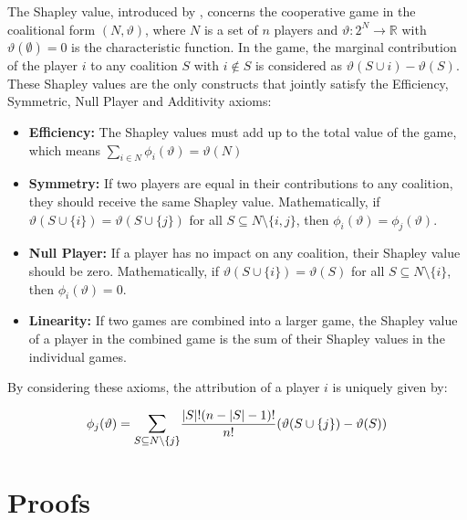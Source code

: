 \documentclass{article} %
\theoremstyle{bfnote}
\begin{document}
The Shapley value, introduced by \cite{shapley1952}, concerns the cooperative game in the coalitional form $(N, \vartheta)$, where $N$ is a set of $n$ players and $\vartheta: 2^N \rightarrow \mathbb{R}$ with $\vartheta(\emptyset)=0$ is the characteristic function. In the game, the marginal contribution of the player $i$ to any coalition $S$ with $i \notin S$ is considered as $\vartheta(S \cup i)-\vartheta(S)$. These Shapley values are the only constructs that jointly satisfy the Efficiency, Symmetric, Null Player and Additivity axioms:

\begin{itemize}
	
	\item \textbf{Efficiency:} The Shapley values must add up to the total value of the game, which means $\sum_{i \in N} \phi_i(\vartheta) = \vartheta(N)$
	\item \textbf{Symmetry:} If two players are equal in their contributions to any coalition, they should receive the same Shapley value. Mathematically, if \(\vartheta(S \cup \{i\}) = \vartheta(S \cup \{j\})\) for all \(S \subseteq N \setminus \{i, j\}\), then \(\phi_i(\vartheta) = \phi_j(\vartheta)\).
	\item \textbf{Null Player:} If a player has no impact on any coalition, their Shapley value should be zero. Mathematically, if \(\vartheta(S \cup \{i\}) = \vartheta(S)\) for all \(S \subseteq N \setminus \{i\}\), then \(\phi_i(\vartheta) = 0\).
	\item \textbf{Linearity:} If two games are combined into a larger game, the Shapley value of a player in the combined game is the sum of their Shapley values in the individual games.
	
\end{itemize}

 By considering these axioms, the attribution of a player $i$ is uniquely given by:

\begin{equation*}
	\phi_j(\vartheta)=\mathlarger{\sum\limits_{S \subseteq N \backslash\{j\}}} \frac{|S| !(n-|S|-1) !}{n !}(\vartheta(S \cup\{j\})-\vartheta(S))
\end{equation*}

\section{Proofs}
\end{document}
